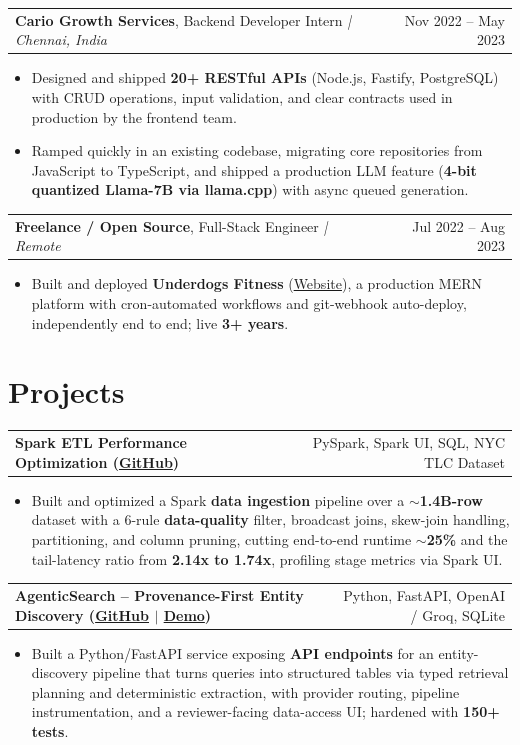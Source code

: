 \documentclass[letterpaper,11pt]{article}
\makeatletter
\newcommand{\expItem}[4]{%
  \vspace{3pt}
  \begin{tabular*}{\textwidth}{@{}l@{\extracolsep{\fill}}r@{}}
    \textbf{#1}, #2 \textit{| #3} & #4 \\
  \end{tabular*}\par\vspace{-2pt}
}
\newcommand{\projItem}[2]{%
  \vspace{6pt}
  \begin{tabular*}{\textwidth}{@{}l@{\extracolsep{\fill}}r@{}}
    \textbf{#1} & #2 \\
  \end{tabular*}\par\vspace{-2pt}
}
\makeatother
\begin{document}
\expItem{Cario Growth Services}{Backend Developer Intern}{Chennai, India}{Nov 2022 -- May 2023}
\begin{itemize}
  \item Designed and shipped \textbf{20+ RESTful APIs} (Node.js, Fastify, PostgreSQL) with CRUD operations, input validation, and clear contracts used in production by the frontend team.
  \item Ramped quickly in an existing codebase, migrating core repositories from JavaScript to TypeScript, and shipped a production LLM feature (\textbf{4-bit quantized Llama-7B via llama.cpp}) with async queued generation.
\end{itemize}

\expItem{Freelance / Open Source}{Full-Stack Engineer}{Remote}{Jul 2022 -- Aug 2023}
\begin{itemize}
  \item Built and deployed \textbf{Underdogs Fitness} (\href{https://www.underdogsfitness.in/}{Website}), a production MERN platform with cron-automated workflows and git-webhook auto-deploy, independently end to end; live \textbf{3+ years}.
\end{itemize}

\section{Projects}

\projItem{Spark ETL Performance Optimization {\normalfont\small(\href{https://github.com/Deva-1903/Spark-ETL-Optimization}{GitHub})}}{PySpark, Spark UI, SQL, NYC TLC Dataset}
\begin{itemize}
  \item Built and optimized a Spark \textbf{data ingestion} pipeline over a \textbf{$\sim$1.4B-row} dataset with a 6-rule \textbf{data-quality} filter, broadcast joins, skew-join handling, partitioning, and column pruning, cutting end-to-end runtime \textbf{$\sim$25\%} and the tail-latency ratio from \textbf{2.14x to 1.74x}, profiling stage metrics via Spark UI.
\end{itemize}

\projItem{AgenticSearch -- Provenance-First Entity Discovery {\normalfont\small(\href{https://github.com/Deva-1903/ciir_agentic_search}{GitHub} $\vert$ \href{https://agentic-search-negglszkwa-uc.a.run.app}{Demo})}}{Python, FastAPI, OpenAI / Groq, SQLite}
\begin{itemize}
  \item Built a Python/FastAPI service exposing \textbf{API endpoints} for an entity-discovery pipeline that turns queries into structured tables via typed retrieval planning and deterministic extraction, with provider routing, pipeline instrumentation, and a reviewer-facing data-access UI; hardened with \textbf{150+ tests}.
\end{itemize}
\end{document}

